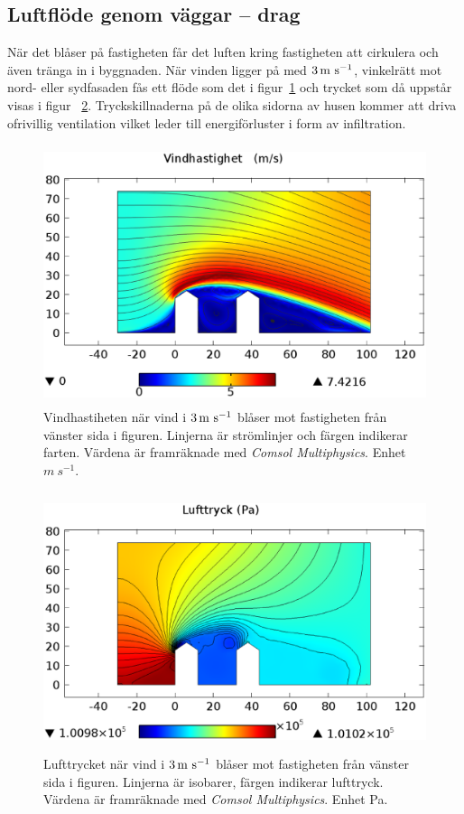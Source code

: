 \subsection{Luftflöde genom väggar – drag}
\label{sec:leakagewall}

När det blåser på fastigheten får det luften kring fastigheten att cirkulera och även tränga in i 
byggnaden. När vinden ligger på med $\unit[3]{m~s^{-1}}$, vinkelrätt mot nord- eller sydfasaden fås 
ett flöde som det i figur~\ref{fig:windspeed} och trycket som då uppstår visas i figur~
\ref{fig:windpressure}. Tryckskillnaderna på de olika sidorna av husen kommer att driva 
ofrivillig ventilation vilket leder till energiförluster i form av infiltration.

\begin{figure}[hpbt]
\centering
\includegraphics[width=127mm,height=76mm]{images/wind3mshdpi.eps}
\caption{\label{fig:windspeed}Vindhastiheten när vind i $\unit[3]{m~s^{-1}}$ blåser mot fastigheten 
från vänster sida i figuren. Linjerna är strömlinjer och färgen indikerar farten. Värdena är 
framräknade med \emph{Comsol Multiphysics}. Enhet $\unit{m~s^{-1}}$.}
\end{figure}


\begin{figure}[hpbt]
\centering
\includegraphics[width=127mm,height=76mm]{images/pressure3mshdpi.eps}

\caption{\label{fig:windpressure}Lufttrycket när vind i $\unit[3]{m~s^{-1}}$ blåser mot fastigheten från vänster sida i figuren. Linjerna är isobarer, färgen indikerar lufttryck. Värdena är framräknade med
\emph{Comsol Multiphysics}. Enhet Pa.}
\end{figure}

